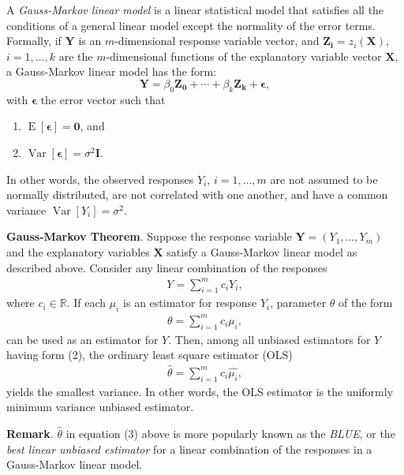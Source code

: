 \documentclass[12pt]{article}
\begin{document}
A \emph{Gauss-Markov linear model} is a linear statistical model
that satisfies all the conditions of a general linear model except
the normality of the error terms.  Formally, if $\boldsymbol{Y}$ is
an $m$-dimensional response variable vector, and
$\boldsymbol{Z_i}=z_i(\boldsymbol{X})$, $i=1,\ldots,k$ are the
$m$-dimensional functions of the explanatory variable vector
$\boldsymbol{X}$, a Gauss-Markov linear model has the form:
$$\boldsymbol{Y}=\beta_0\boldsymbol{Z_0}+\cdots+
\beta_k\boldsymbol{Z_k}+\boldsymbol{\epsilon},$$ with
$\boldsymbol{\epsilon}$ the error vector such that
\begin{enumerate}
\item $\operatorname{E}[\boldsymbol{\epsilon}]=\boldsymbol{0}$, and
\item
$\operatorname{Var}[\boldsymbol{\epsilon}]=\sigma^2\boldsymbol{I}$.
\end{enumerate}

In other words, the observed responses $Y_i$, $i=1,\ldots,m$ are not
assumed to be normally distributed, are not correlated with one
another, and have a common variance
$\operatorname{Var}[Y_i]=\sigma^2$.

\textbf{Gauss-Markov Theorem}. Suppose the response variable
$\boldsymbol{Y}=(Y_1,\ldots,Y_m)$ and the explanatory variables
$\boldsymbol{X}$ satisfy a Gauss-Markov linear model as described
above. Consider any linear combination of the responses
\begin{eqnarray}
Y=\sum_{i=1}^m c_iY_i,
\end{eqnarray}
where $c_i\in\mathbb{R}$.  If each $\mu_i$ is an estimator for response $Y_i$, parameter $\theta$ of the form
\begin{eqnarray}
\theta=\sum_{i=1}^m c_i\mu_i,
\end{eqnarray}
can be used as an estimator for $Y$.  Then, among all unbiased estimators for $Y$ having form (2), the ordinary least square estimator (OLS)
\begin{eqnarray}
\hat{\theta}=\sum_{i=1}^m c_i\hat{\mu_i},
\end{eqnarray}
yields the smallest variance.  In other words, the OLS estimator is the uniformly minimum variance unbiased estimator.

\textbf{Remark}.  $\hat{\theta}$ in equation (3) above is more
popularly known as the \emph{BLUE}, or the \emph{best linear unbiased estimator}
for a linear combination of the responses in a Gauss-Markov linear
model.
\end{document}
